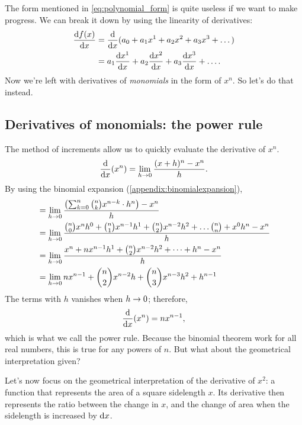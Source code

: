 The form mentioned in \cref{eq:polynomial_form} is quite useless if we want to make progress. We can break it down by using the linearity of derivatives:
\begin{align}
    \odv{f(x)}{x} &= \odv*{(a_0 + a_1x^1 + a_2x^2 + a_3x^3 + \dots)}{x} \\
    &= a_1\odv{x^1}{x} + a_2\odv{x^2}{x} + a_3\odv{x^3}{x} + \dots.
\end{align}
Now we're left with derivatives of \emph{monomials} in the form of $x^n$. So let's do that instead.

\subsection{Derivatives of monomials: the power rule}
\label{sec:derivativespowerrule}

The method of increments allow us to quickly evaluate the derivative of $x^n$.
\begin{equation}
    \odv*{(x^n)}{x} = \lim_{h \appr 0}\frac{(x + h)^n - x^n}{h}.
\end{equation}
By using the binomial expansion (\cref{appendix:binomialexpansion}), 
\begin{align}
    &= \lim_{h \rightarrow 0}\frac{\left(\sum_{k = 0}^n{n\choose k}x^{n - k}\cdot h^n\right) - x^n}{h} \\
    &= \lim_{h \rightarrow 0}{{n\choose 0}x^nh^0 + {n\choose 1}x^{n - 1}h^1 + {n\choose 2}x^{n - 2}h^2 +\dots {n\choose n} + x^0h^n - x^n\over h} \\
    &= \lim_{h \rightarrow 0}\frac{x^n + nx^{n - 1}h^1 + {n\choose 2}x^{n - 2}h^2 + \dots + h^n -x^n}{h} \\
    &= \lim_{h \rightarrow 0}nx^{n - 1} + {n\choose 2}x^{n - 2}h + {n\choose 3}x^{n - 3}h^2 + h^{n - 1}
\end{align}
The terms with $h$ vanishes when $h \rightarrow 0$; therefore,
\begin{equation}
	\odv*{(x^n)}{x} = nx^{n - 1}, \label{eq:power_rule}
\end{equation}
which is what we call the power rule. Because the binomial theorem work for all real numbers, this is true for any powers of $n$. But what about the geometrical interpretation given?

Let's now focus on the geometrical interpretation of the derivative of $x^2$: a function that represents the area of a square sidelength $x$. Its derivative then represents the ratio between the change in $x$, and the change of area when the sidelength is increased by $\odif{x}$.


